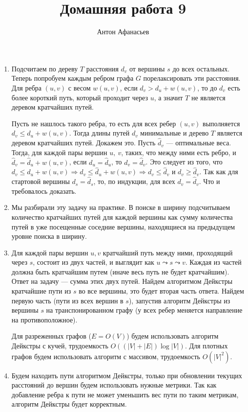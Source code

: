 \documentclass[10pt]{article}
\begin{document}
\title{Домашняя работа 9}
\author{Антон Афанасьев}
\maketitle

\begin{enumerate}

\item Подсчитаем по дереву $T$ расстояния $d_v$ от вершины $s$ до всех остальных. Теперь попробуем каждым ребром графа $G$ порелаксировать эти расстояния. Для ребра $(u, v)$ с весом $w(u, v)$, если $d_v > d_u + w(u, v)$, то до $d_v$ есть более короткий путь, который проходит через $u$, а значит $T$ не является деревом кратчайших путей. 

Пусть не нашлось такого ребра, то есть для всех ребер $(u, v)$ выполняется $d_v \le d_u + w(u, v)$. Тогда длины путей $d_v$ минимальные и дерево $T$ является деревом кратчайших путей. Докажем это. Пусть $\hat d_v$ --- оптимальные веса. Тогда, для каждой пары вершин $u,\ v$, таких, что между ними есть ребро, и $\hat d_v = \hat d_u + w(u, v)$, если $d_u = \hat d_u$, то $d_v = \hat d_v$. Это следует из того, что $d_v \le d_u + w(u, v) \Rightarrow d_v \le \hat d_u + w(u, v) \Rightarrow d_v \le \hat d_v$ и $d_v \ge \hat d_v$. Так как для стартовой вершины $d_s = \hat d_s$, то, по индукции, для всех $d_v = \hat d_v$. Что и требовалось доказать.

\item Мы разбирали эту задачу на практике. В поиске в ширину подсчитываем количество кратчайших путей для каждой вершины как сумму количества путей в уже посещенные соседние вершины, находящиеся на предыдущем уровне поиска в ширину.

\item Для каждой пары вершин $u, v$ кратчайший путь между ними, проходящий через $s$, состоит из двух частей, и выглядит как $u \leadsto s \leadsto v$. Каждая из частей должна быть кратчайшим путем (иначе весь путь не будет кратчайшим). Ответ на задачу --- сумма этих двух путей. Найдем алгоритмом Дейкстры кратчайшие пути из $s$ во все вершины, это будет вторая часть ответа. Найдем первую часть (пути из всех вершин в $s$), запустив алгоритм Дейкстры из вершины $s$ на транспонированном графу (у всех ребер меняется направление на противоположное).

Для разреженных графов ($E=O(V)$) будем использовать алгоритм Дейкстры с кучей, трудоемкость $O((|V| + |E|) \log |V|)$. Для плотных графов будем использовать алгоритм с массивом, трудоемкость $O(|V|^2)$.

\item Будем находить пути алгоритмом Дейкстры, только при обновлении текущих расстояний до вершин будем использовать нужные метрики. Так как добавление ребра к пути не может уменьшить вес пути по таким метрикам, алгоритм Дейкстры будет корректным.

\end{enumerate}
\end{document}
